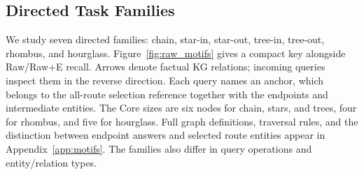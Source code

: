 \subsection{Directed Task Families}
\label{sec:motifs}
We study seven directed families: chain, star-in, star-out, tree-in, tree-out, rhombus, and hourglass. Figure~\ref{fig:raw_motifs} gives a compact key alongside Raw/Raw+E recall. Arrows denote factual KG relations; incoming queries inspect them in the reverse direction. Each query names an anchor, which belongs to the all-route selection reference together with the endpoints and intermediate entities. The Core sizes are six nodes for chain, stars, and trees, four for rhombus, and five for hourglass. Full graph definitions, traversal rules, and the distinction between endpoint answers and selected route entities appear in Appendix~\ref{app:motifs}. The families also differ in query operations and entity/relation types.
